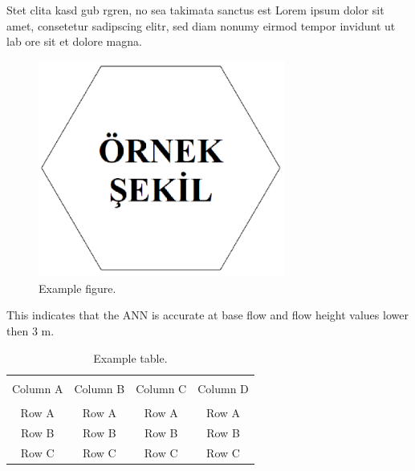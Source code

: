 
Stet clita kasd gub rgren, no sea takimata sanctus est Lorem ipsum dolor sit amet, consetetur sadipscing elitr, sed diam nonumy eirmod tempor invidunt ut lab ore sit et dolore magna\footnotemark.


\begin{figure}[t]
	\centering
	\includegraphics[width=230pt,keepaspectratio=true]{./fig/sekil6}
	\caption{Example figure.}
	\label{Figure4.1}
\end{figure}

This indicates that the ANN is accurate at base flow and flow height values lower then 3 m. 

\begin{table}[h]
	{\setlength{\tabcolsep}{14pt}
		\caption{Example table.}
		\begin{center}
			\vspace{-6mm}
			\begin{tabular}{cccc}
				\hline \\[-2.45ex] \hline \\[-2.1ex]
				Column A & Column B & Column C & Column D \\
				\hline \\[-1.8ex]
				Row A & Row A & Row A & Row A \\
				Row B & Row B & Row B & Row B \\
				Row C & Row C & Row C & Row C \\
				[-0ex] \hline
			\end{tabular}
			\vspace{-6mm}
		\end{center}
		\label{Table4.1}}
\end{table}

